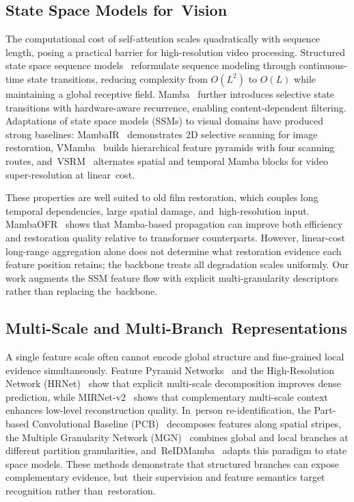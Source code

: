 \documentclass[symmetry,article,accept,pdftex,moreauthors]{Definitions/mdpi}
\begin{document}
\subsection{State Space Models for~Vision}
\label{subsec:ssm}

The computational cost of self-attention scales quadratically with sequence length, posing a practical barrier for high-resolution video processing. Structured state space sequence models~\cite{gu2022s4} reformulate sequence modeling through continuous-time state transitions, reducing complexity from $O(L^2)$ to $O(L)$ while maintaining a global receptive field. Mamba~\cite{gu2024mamba} further introduces selective state transitions with hardware-aware recurrence, enabling content-dependent filtering. Adaptations of state space models (SSMs) to visual domains have produced strong baselines: MambaIR~\cite{guo2024mambair} demonstrates 2D selective scanning for image restoration, VMamba~\cite{liu2024vmamba} builds hierarchical feature pyramids with four scanning routes, and~VSRM~\cite{tran2025vsrm} alternates spatial and temporal Mamba blocks for video super-resolution at linear~cost.

These properties are well suited to old film restoration, which couples long temporal dependencies, large spatial damage, and~high-resolution input. MambaOFR~\cite{mao2025mambaofr} shows that Mamba-based propagation can improve both efficiency and restoration quality relative to transformer counterparts. However, linear-cost long-range aggregation alone does not determine what restoration evidence each feature position retains; the backbone treats all degradation scales uniformly. Our work augments the SSM feature flow with explicit multi-granularity descriptors rather than replacing the~backbone.

\subsection{Multi-Scale and Multi-Branch~Representations}
\label{subsec:multigran}

A single feature scale often cannot encode global structure and fine-grained local evidence simultaneously. Feature Pyramid Networks~\cite{lin2017fpn} and the High-Resolution Network (HRNet)~\cite{wang2021hrnet} show that explicit multi-scale decomposition improves dense prediction, while MIRNet-v2~\cite{zamir2022mirnetv2} shows that complementary multi-scale context enhances low-level reconstruction quality. In~person re-identification, the Part-based Convolutional Baseline (PCB)~\cite{sun2018pcb} decomposes features along spatial stripes, the Multiple Granularity Network (MGN)~\cite{wang2018mgn} combines global and local branches at different partition granularities, and~ReIDMamba~\cite{gu2025reidmamba} adapts this paradigm to state space models. These methods demonstrate that structured branches can expose complementary evidence, but~their supervision and feature semantics target recognition rather than~restoration.
\end{document}
